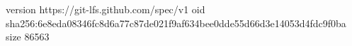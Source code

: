 version https://git-lfs.github.com/spec/v1
oid sha256:6e8eda08346fc8d6a77c87de021f9af634bee0dde55d66d3e14053d4fdc9f0ba
size 86563
